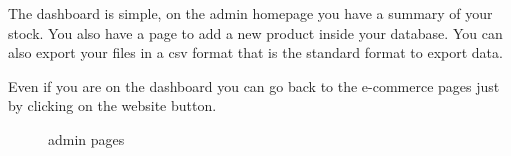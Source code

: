 \documentclass{article}
\begin{document}
The dashboard is simple, on the admin homepage you have a summary of your stock. You also have a page to add a new product inside your database. You can also export your files in a csv format that is the standard format to export data.

Even if you are on the dashboard you can go back to the e-commerce pages just by clicking on the website button.

\begin{figure}[h!]
    \centering
    \qquad
    \caption{admin pages}%
    \label{fig:admin}%
\end{figure}
\end{document}
